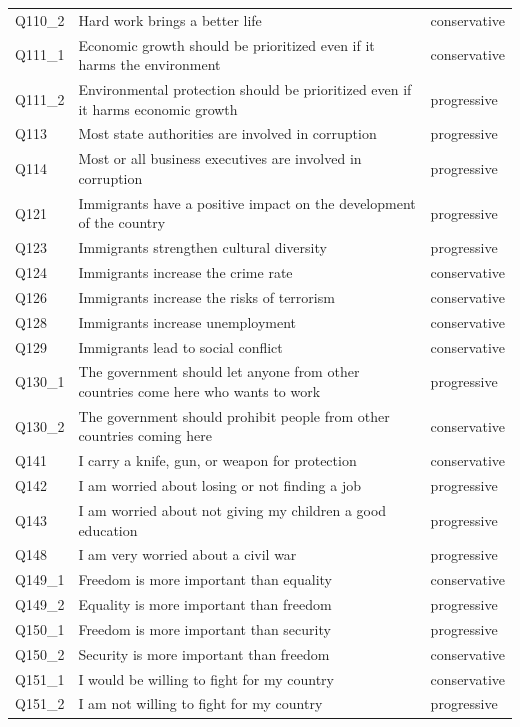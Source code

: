 \documentclass[]{ceurart}
\begin{document}
\begin{longtable}{@{\extracolsep{\fill}}l>{\raggedright\arraybackslash}p{}l}
Q110\_2 & Hard work brings a better life & conservative \\ 
Q111\_1 & Economic growth should be prioritized even if it harms the environment & conservative \\ 
Q111\_2 & Environmental protection should be prioritized even if it harms economic growth & progressive \\ 
Q113 & Most state authorities are involved in corruption & progressive \\ 
Q114 & Most or all business executives are involved in corruption & progressive \\ 
Q121 & Immigrants have a positive impact on the development of the country & progressive \\ 
Q123 & Immigrants strengthen cultural diversity & progressive \\ 
Q124 & Immigrants increase the crime rate & conservative \\ 
Q126 & Immigrants increase the risks of terrorism & conservative \\ 
Q128 & Immigrants increase unemployment & conservative \\ 
Q129 & Immigrants lead to social conflict & conservative \\ 
Q130\_1 & The government should let anyone from other countries come here who wants to work & progressive \\ 
Q130\_2 & The government should prohibit people from other countries coming here & conservative \\ 
Q141 & I carry a knife, gun, or weapon for protection & conservative \\ 
Q142 & I am worried about losing or not finding a job & progressive \\ 
Q143 & I am worried about not giving my children a good education & progressive \\ 
Q148 & I am very worried about a civil war & progressive \\ 
Q149\_1 & Freedom is more important than equality & conservative \\ 
Q149\_2 & Equality is more important than freedom & progressive \\ 
Q150\_1 & Freedom is more important than security & progressive \\ 
Q150\_2 & Security is more important than freedom & conservative \\ 
Q151\_1 & I would be willing to fight for my country & conservative \\ 
Q151\_2 & I am not willing to fight for my country & progressive \\ 

\end{longtable}
\end{document}
